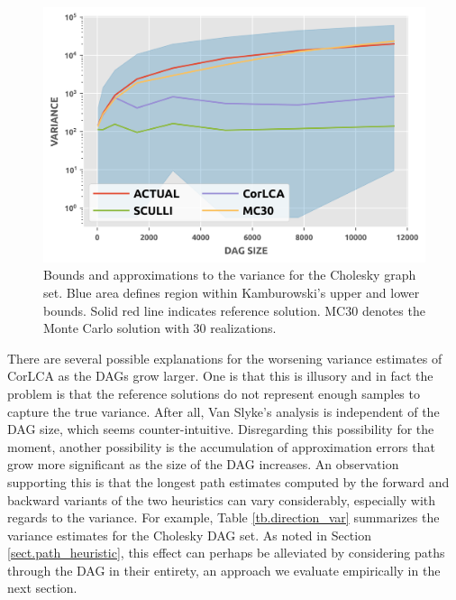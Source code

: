 \documentclass[12pt]{article}
\begin{document}
      \begin{figure}
	\centering	
	\includegraphics[scale=1.0]{chol_variance.png}
	\caption{Bounds and approximations to the variance for the Cholesky graph set. Blue area defines region within Kamburowski's upper and lower bounds. Solid red line indicates reference solution. MC30 denotes the Monte Carlo solution with 30 realizations.}	
	\label{plot.variance_existing}
      \end{figure}

      There are several possible explanations for the worsening variance estimates of CorLCA as the DAGs grow larger. One is that this is illusory and in fact the problem is that the reference solutions do not represent enough samples to capture the true variance. After all, Van Slyke's analysis is independent of the DAG size, which seems counter-intuitive. Disregarding this possibility for the moment, another possibility is the accumulation of approximation errors that grow more significant as the size of the DAG increases. An observation supporting this is that the longest path estimates computed by the forward and backward variants of the two heuristics can vary considerably, especially with regards to the variance. For example, Table \ref{tb.direction_var} summarizes the variance estimates for the Cholesky DAG set. As noted in Section \ref{sect.path_heuristic}, this effect can perhaps be alleviated by considering paths through the DAG in their entirety, an approach we evaluate empirically in the next section.
\end{document}
